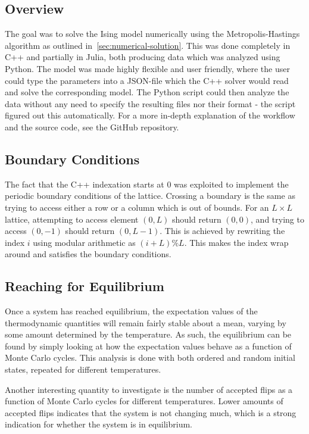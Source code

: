 \documentclass[aps,reprint]{revtex4-1}
\begin{document}
\subsection{Overview}
\label{sec:overview}


The goal was to solve the Ising model numerically using the Metropolis-Hastings
algorithm as outlined in~\ref{sec:numerical-solution}. This was done completely
in C++ and partially in Julia, both producing data which was analyzed using
Python. The model was made highly flexible and user friendly, where the user could
type the parameters into a JSON-file which the C++ solver would read and solve
the corresponding model.
The Python script could then analyze the data without any need to specify the
resulting files nor their format - the script figured out this automatically.
For a more in-depth explanation of the workflow and the source code, see the
GitHub repository.

\subsection{Boundary Conditions}
\label{sec:boundary-conditions}

The fact that the C++ indexation starts at \(0\) was exploited to implement the
periodic boundary conditions of the lattice. Crossing a boundary is the same as
trying to access either a row or a column which is out of bounds. For an
\(L\times L\) lattice, attempting to access element \((0, L)\) should return
\((0,0)\), and trying to access \((0, -1)\) should return \((0, L-1)\). This is
achieved by rewriting the index \(i\) using modular arithmetic as \((i+L) \%
L\). This makes the index wrap around and satisfies the boundary conditions.

\subsection{Reaching for Equilibrium}
\label{sec:reaching-equilibrium-1}

Once a system has reached equilibrium, the expectation values of the
thermodynamic quantities will remain fairly stable about a mean, varying by some
amount determined by the temperature. As such, the equilibrium can be found by
simply looking at how the expectation values behave as a function of Monte Carlo cycles.
This analysis is done with both ordered and random initial states, repeated for different temperatures.

Another interesting quantity to investigate is the number of accepted flips as
a function of Monte Carlo cycles for different temperatures. Lower amounts of
accepted flips indicates that the system is not changing much, which is a strong
indication for whether the system is in equilibrium.
\end{document}
